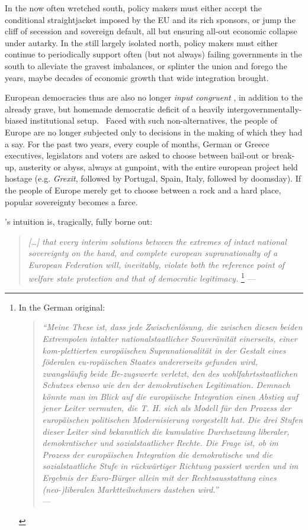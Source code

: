 \documentclass[11pt,a4paper,oneside]{article}
\begin{document}
In the now often wretched south, policy makers must either accept the conditional straightjacket imposed by the \gls{EU} and its rich sponsors, or jump the cliff of secession and sovereign default, all but ensuring all-out economic collapse under autarky. 
In the still largely isolated north, policy makers must either continue to periodically support often (but not always) failing governments in the south to alleviate the gravest imbalances, or splinter the union and forego the years, maybe decades of economic growth that wide integration brought.

European democracies thus are also no longer \emph{input congruent} \citep{Zurn-2000-aa}, in addition to the already grave, but homemade democratic deficit of a heavily intergovernmentally-biased institutional setup.~
Faced with such non-alternatives, the people of Europe are no longer subjected only to decisions in the making of which they had a say. 
For the past two years, every couple of months, German or Greece executives, legislators and voters are asked to choose between bail-out or break-up, austerity or abyss, always at gunpoint, with the entire european project held hostage (e.g. \emph{Grexit}, followed by Portugal, Spain, Italy, followed by doomsday). 
If the people of Europe merely get to choose between a rock and a hard place, popular sovereignty becomes a farce.

\citeauthor{Offe1998}'s \citeyear{Offe1998} intuition is, tragically, fully borne out:	
\begin{quote}
	\emph{[\ldots] that every interim solutions between the extremes of intact national sovereignty on the hand, and complete european supranationalty of a European Federation will, inevitably, violate both the reference point of welfare state protection and that of democratic legitimacy.}
	\footnote{\label{fn:Offe-regress}
		In the German original:\\
		\begin{quote}
			\emph{``Meine These ist, dass jede Zwischenl\"{o}sung, die zwischen diesen beiden Extrempolen intakter nationalstaatlicher Souver\"{a}nit\"{a}t einerseits, einer kom-plettierten europ\"{a}ischen Supranationalität in der Gestalt eines föderalen eu-ropäischen Staates andererseits gefunden wird, zwangsl\"{a}ufig beide Be-zugswerte verletzt, den des wohlfahrtsstaatlichen Schutzes ebenso wie den der demokratischen Legitimation. 
			Demnach k\"{o}nnte man im Blick auf die europäische Integration einen Abstieg auf jener Leiter vermuten, die T. H. \cite{Marshall-1950-aa} sich als Modell für den Prozess der europ\"{a}ischen politischen Modernisierung vorgestellt hat. 
			Die drei Stufen dieser Leiter sind bekanntlich die kumulative Durchsetzung liberaler, demokratischer und sozialstaatlicher Rechte. 
			Die Frage ist, ob im Prozess der europäischen Integration die demokratische und die sozialstaatliche Stufe in r\"{u}ckw\"{a}rtiger Richtung passiert werden und im Ergebnis der Euro-B\"{u}rger allein mit der Rechtsausstattung eines (neo-)liberalen Marktteilnehmers dastehen wird.''}\\
			--- \cite[41]{Offe1998}\\
		\end{quote}
	}
	--- \cite[41]{Offe1998}
\end{quote}
\end{document}
